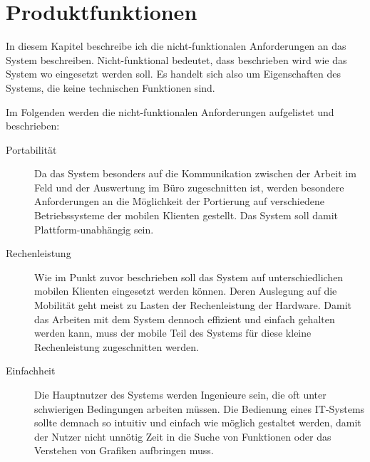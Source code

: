 \section{Produktfunktionen}
In diesem Kapitel beschreibe ich die nicht-funktionalen Anforderungen an das System beschreiben. Nicht-funktional bedeutet, dass beschrieben wird wie das System wo eingesetzt werden soll. Es handelt sich also um Eigenschaften des Systems, die keine technischen Funktionen sind.

Im Folgenden werden die nicht-funktionalen Anforderungen aufgelistet und beschrieben:
\begin{description}
\item[Portabilität] Da das System besonders auf die Kommunikation zwischen der Arbeit im Feld und der Auswertung im Büro zugeschnitten ist, werden besondere Anforderungen an die Möglichkeit der Portierung auf verschiedene Betriebssysteme der mobilen Klienten gestellt. Das System soll damit Plattform-unabhängig sein. 
\item[Rechenleistung] Wie im Punkt zuvor beschrieben soll das System auf unterschiedlichen mobilen Klienten eingesetzt werden können. Deren Auslegung auf die Mobilität geht meist zu Lasten der Rechenleistung der Hardware. Damit das Arbeiten mit dem System dennoch effizient und einfach gehalten werden kann, muss der mobile Teil des Systems für diese kleine Rechenleistung zugeschnitten werden.
\item[Einfachheit] Die Hauptnutzer des Systems werden Ingenieure sein, die oft unter schwierigen Bedingungen arbeiten müssen. Die Bedienung eines IT-Systems sollte demnach so intuitiv und einfach wie möglich gestaltet werden, damit der Nutzer nicht unnötig Zeit in die Suche von Funktionen oder das Verstehen von Grafiken aufbringen muss.
\end{description}




